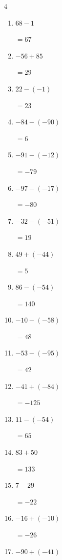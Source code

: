 \begin{multicols}{4}
\begin{enumerate}
  \item $68-1$

        $=67$

  \item $-56+85$

        $=29$

  \item $22-(-1)$

        $=23$

  \item $-84-(-90)$

        $=6$

  \item $-91-(-12)$

        $=-79$

  \item $-97-(-17)$

        $=-80$

  \item $-32-(-51)$

        $=19$

  \item $49+(-44)$

        $=5$

  \item $86-(-54)$

        $=140$

  \item $-10-(-58)$

        $=48$

  \item $-53-(-95)$

        $=42$

  \item $-41+(-84)$

        $=-125$

\columnbreak %

  \item $11-(-54)$

        $=65$

  \item $83+50$

        $=133$

  \item $7-29$

        $=-22$

  \item $-16+(-10)$

        $=-26$

  \item $-90+(-41)$


\end{enumerate}
\end{multicols}
